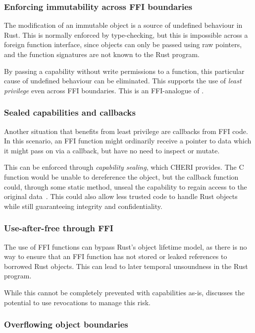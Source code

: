 \documentclass[dissertation.tex]{subfiles}
\begin{document}
\subsubsection{Enforcing immutability across FFI boundaries}
The modification of an immutable object is a source of undefined
behaviour in Rust.
This is normally enforced by type-checking, but this is impossible
across a foreign function interface, since objects can only be passed
using raw pointers, and the function signatures are not known to the
Rust program.

By passing a capability without write permissions to a function, this
particular cause of undefined behaviour can be eliminated.
This supports the use of \emph{least privilege} even across FFI
boundaries.
This is an FFI-analogue of .

\subsubsection{Sealed capabilities and callbacks}
Another situation that benefits from least privilege are callbacks from
FFI code.
In this scenario, an FFI function might ordinarily receive a pointer to
data which it might pass on via a callback, but have no need to inspect
or mutate.

This can be enforced through \emph{capability sealing}, which CHERI
provides.
The C function would be unable to dereference the object, but the
callback function could, through some static method, unseal the
capability to regain access to the original data~\cite{cheri-v6}.
This could also allow less trusted code to handle Rust objects while
still guaranteeing integrity and confidentiality.

\subsubsection{Use-after-free through FFI}
The use of FFI functions can bypass Rust's object lifetime model, as
there is no way to ensure that an FFI function has not stored or leaked
references to borrowed Rust objects.
This can lead to later temporal unsoundness in the Rust program.

While this cannot be completely prevented with capabilities as-is,
 discusses the potential to use revocations
to manage this risk.

\subsubsection{Overflowing object boundaries}
\end{document}
